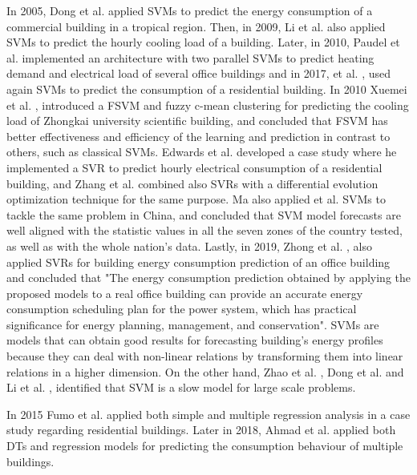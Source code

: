 In 2005, Dong et al. \cite{svm2} applied \ac{SVM}s to predict the energy consumption of a commercial building in a tropical region. Then, in 2009, Li et al. \cite{svmr1} also applied \ac{SVM}s to predict the hourly cooling load of a building. Later, in 2010, Paudel et al. \cite{svm3} implemented an architecture with two parallel \ac{SVM}s to predict heating demand and electrical load of several office buildings and in 2017, et al. \cite{svmr7}, used again \ac{SVM}s to predict the consumption of a residential building. In 2010 Xuemei et al. \cite{svmr2}, introduced a \ac{FSVM} and fuzzy c-mean clustering for predicting the cooling load of Zhongkai university scientific building, and concluded that \ac{FSVM} has better effectiveness and efficiency of the learning and prediction in contrast to others, such as classical \ac{SVM}s. Edwards et al. \cite{svmr3} developed a case study where he implemented a \ac{SVR} to predict hourly electrical consumption of a residential building, and Zhang et al. \cite{svmr4} combined also \ac{SVR}s with a differential evolution optimization technique for the same purpose. Ma also applied et al. \cite{svmr5} \ac{SVM}s to tackle the same problem in China, and concluded that \ac{SVM} model forecasts are well aligned with the statistic values in all the seven zones of the country tested, as well as with the whole nation's data. Lastly, in 2019, Zhong et al. \cite{svmr6}, also applied \ac{SVR}s for building energy consumption prediction of an office building and concluded that "The energy consumption prediction obtained by applying the proposed models to a real office building can provide an accurate energy consumption scheduling plan for the power system, which has practical significance for energy planning, management, and conservation". \ac{SVM}s are models that can obtain good results for forecasting building's energy profiles because they can deal with non-linear relations by transforming them into linear relations in a higher dimension. On the other hand, Zhao et al. \cite{svm3}, Dong et al. \cite{svm2} and Li et al. \cite{svm5}, identified that \ac{SVM} is a slow model for large scale problems.
 
In 2015 Fumo et al. \cite{regression0} applied both simple and multiple regression analysis in a case study regarding residential buildings. Later in 2018, Ahmad et al. \cite{dt0} applied both DTs and regression models for predicting the consumption behaviour of multiple buildings.

